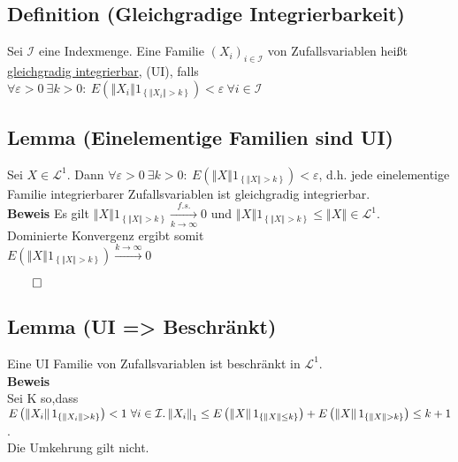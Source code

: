 \documentclass[german,10pt,oneside, fleqn, a4paper]{article}
\newcommand {\N}	{\mathbb{N}}
\newcommand{\brc}[1]{\left(#1\right)}
\newcommand{\brac}[1]{\left\lbrace #1\right\rbrace}
\newcommand{\folge}[3][\N]{\left(#2_#3\right)_{#3\in #1}}
\newcommand{\norm}[1]{\left\Vert #1 \right\Vert}
\newcommand{\QED}{\begin{flushright}$\qed$\end{flushright}}
\newcommand{\mc}[1]{\mathcal{#1}}
\newcommand{\lp}[1]{\mc{L}^{#1}}
\newcommand{\beweis}{\textbf{Beweis}\\}
\newcommand{\1}[1]{1_{#1}}
\newcommand{\2}[1]{\1{\brac{#1}}}
\begin{document}
\subsection{Definition (Gleichgradige Integrierbarkeit)}
Sei $\mc{I}$ eine Indexmenge. Eine Familie $\folge[\mc{I}]{X}{i}$ von Zufallsvariablen heißt \underline{gleichgradig integrierbar}, (UI), falls\\ $\forall\varepsilon>0\ \exists k>0:\ E\brc{\norm{X_i}1_{\brac{\norm{X_i}>k}}}<\varepsilon\ \forall i\in\mc{I}$

\subsection{Lemma (Einelementige Familien sind UI)}
Sei $X\in\mc{L}^1$. Dann $\forall\varepsilon>0\ \exists k>0:\ E\brc{\norm{X}1_{\brac{\norm{X}>k}}}<\varepsilon$, d.h. jede einelementige Familie integrierbarer Zufallsvariablen ist gleichgradig integrierbar.\\
\textbf{Beweis}
Es gilt $\norm{X}1_{\brac{\norm{X}>k}}\xrightarrow[k\rightarrow\infty]{f.s.}0$ und $\norm{X}1_{\brac{\norm{X}>k}}\leq \norm{X}\in\lp{1}$. \\
Dominierte Konvergenz ergibt somit \\
$E\brc{\norm{X}1_{\brac{\norm{X}>k}}}\xrightarrow{k\rightarrow\infty}0$\QED

\subsection{Lemma (UI => Beschränkt)}
\label{2.13}
Eine UI Familie von Zufallsvariablen ist beschränkt in $\lp{1}$.\\
\beweis
Sei K so,dass $E\brc{\norm{X_i}1_{\brac{\norm{X_i}>k}}}<1\ \forall i\in\mc{I}.\\
\norm{X_i}_1\leq E\brc{\norm{X}1_{\brac{\norm{X}\leq k}}}+E\brc{\norm{X}1_{\brac{\norm{X}>k}}}\leq k+1$.\\
Die Umkehrung gilt nicht.
\end{document}

